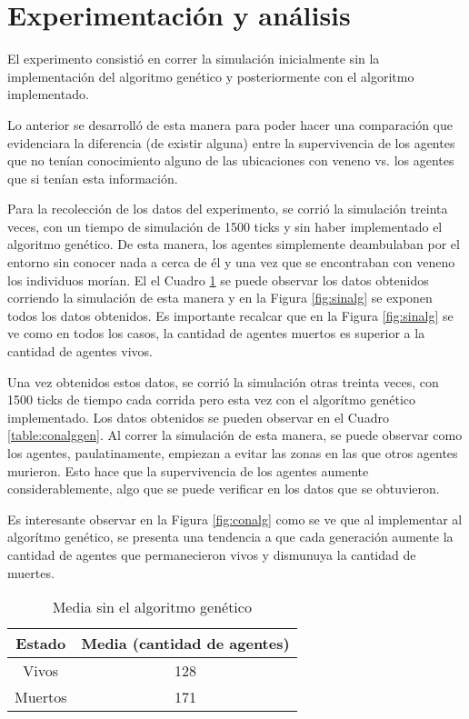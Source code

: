 \documentclass[times,10pt,twocolumn]{article}
\begin{document}
\section{Experimentación y análisis}
El experimento consistió en correr la simulación inicialmente sin la implementación del algoritmo genético y posteriormente con el algoritmo implementado.\par
Lo anterior se desarrolló de esta manera para poder hacer una comparación que evidenciara la diferencia (de existir alguna) entre la supervivencia de los agentes que no tenían conocimiento alguno de las ubicaciones con veneno vs. los agentes que si tenían esta información.\par
Para la recolección de los datos del experimento, se corrió la simulación treinta veces, con un tiempo de simulación de 1500 ticks y sin haber implementado el algoritmo genético. De esta manera, los agentes simplemente deambulaban por el entorno sin conocer nada a cerca de él y una vez que se encontraban con veneno los individuos morían. El el Cuadro \ref{table:sinalggen} se puede observar los datos obtenidos corriendo la simulación de esta manera y en la Figura \ref{fig:sinalg} se exponen todos los datos obtenidos. Es importante recalcar que en la Figura \ref{fig:sinalg} se ve como en todos los casos, la cantidad de agentes muertos es superior a la cantidad de agentes vivos.\par
Una vez obtenidos estos datos, se corrió la simulación otras treinta veces, con 1500 ticks de tiempo cada corrida pero esta vez con el algorítmo genético implementado. Los datos obtenidos se pueden observar en el Cuadro \ref{table:conalggen}. Al correr la simulación de esta manera, se puede observar como los agentes, paulatinamente, empiezan a evitar las zonas en las que otros agentes murieron. Esto hace que la supervivencia de los agentes aumente considerablemente, algo que se puede verificar en los datos que se obtuvieron.\par
Es interesante observar en la Figura \ref{fig:conalg} como se ve que al implementar al algorítmo genético, se presenta una tendencia a que cada generación aumente la cantidad de agentes que permanecieron vivos y dismunuya la cantidad de muertes.\par


    \begin{table}[h!]
    \centering
    \caption{Media sin el algoritmo genético}
    \hfill\break
    \begin{tabular}{c c}
    Estado & Media (cantidad de agentes) \\ [0.5ex]
    \hline
    Vivos & 128\\
    Muertos & 171\\
    \end{tabular}
    \label{table:sinalggen}
    \end{table}
    
\end{document}
